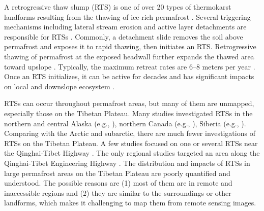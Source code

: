 \documentclass[preprint,12pt,authoryear]{elsarticle}
\begin{document}
A retrogressive thaw slump (RTS) is one of over 20 types of thermokarst landforms resulting from the thawing of ice-rich permafrost \citep{czudek_thermokarst_1970, jorgenson_response_2005, jorgenson_thermokarst_2013,kokelj2013advances}. Several triggering mechanisms including lateral stream erosion and active layer detachments are responsible for RTSs \citep{french2017periglacial}. Commonly, a detachment slide removes the soil above permafrost and exposes it to rapid thawing, then initiates an RTS. Retrogressive thawing of permafrost at the exposed headwall further expands the thawed area toward upslope \citep{jorgenson_thermokarst_2013}. Typically, the maximum retreat rates are 6--8 meters per year \citep{jorgenson_thermokarst_2013}. Once an RTS initializes, it can be active for decades \citep{burn1989geomorphology, lacelle2010climatic, swanson2018growth,lewkowicz2019extremes} and has significant impacts on local and downslope ecosystem \citep{gooseff2009effects, pierre2018unprecedented, zolkos2018mineral}. 

RTSs can occur throughout permafrost areas, but many of them are unmapped, especially those on the Tibetan Plateau. Many studies investigated RTSs in the northern and central Alaska (e.g., \citealp{swanson2018growth,balser2014timing}), northern Canada (e.g., \citealp{burn1990canadian, cassidy2017impacts, armstrong2018thaw,lewkowicz2019extremes}), Siberia (e.g., \citealp{leibman2003dynamics, zwieback2018sub}). %
Comparing with the Arctic and subarctic, there are much fewer investigations of RTSs on the Tibetan Plateau. A few studies focused on one or several RTSs near the Qinghai-Tibet Highway \citep{wang1995situ,sun2017creep}. The only regional studies targeted an area along the Qinghai-Tibet Engineering Highway \citep{niu2014thaw, niu2016thaw}. 
The distribution and impacts of RTSs in large permafrost areas on the Tibetan Plateau are poorly quantified and understood. 
The possible reasons are (1) most of them are in remote and inaccessible regions and (2) they are similar to the surroundings or other landforms, which makes it challenging to map them from remote sensing images.
\end{document}
